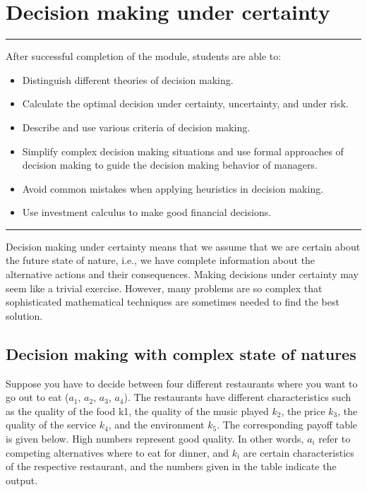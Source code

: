 \documentclass[
  12pt,
  oneside]{book}
\providecommand{\tightlist}{%
  \setlength{\itemsep}{0pt}\setlength{\parskip}{0pt}}
\theoremstyle{definition}
\theoremstyle{definition}
\theoremstyle{definition}
\theoremstyle{definition}
\theoremstyle{remark}
\begin{document}
\section{Decision making under certainty}\label{decision-making-under-certainty}

\begin{center}\rule{0.5\linewidth}{0.5pt}\end{center}

After successful completion of the module, students are able to:

\begin{itemize}
\tightlist
\item
  Distinguish different theories of decision making.
\item
  Calculate the optimal decision under certainty, uncertainty, and under risk.
\item
  Describe and use various criteria of decision making.
\item
  Simplify complex decision making situations and use formal approaches of decision making to guide the decision making behavior of managers.
\item
  Avoid common mistakes when applying heuristics in decision making.
\item
  Use investment calculus to make good financial decisions.
\end{itemize}

\begin{center}\rule{0.5\linewidth}{0.5pt}\end{center}

Decision making under certainty means that we assume that we are certain about the future state of nature, i.e., we have complete information about the alternative actions and their consequences. Making decisions under certainty may seem like a trivial exercise. However, many problems are so complex that sophisticated mathematical techniques are sometimes needed to find the best solution.

\subsection{Decision making with complex state of natures}\label{decision-making-with-complex-state-of-natures}

Suppose you have to decide between four different restaurants where you want to go out to eat (\(a_1\), \(a_2\), \(a_3\), \(a_4\)). The restaurants have different characteristics such as the quality of the food k1, the quality of the music played \(k_2\), the price \(k_3\), the quality of the service \(k_4\), and the environment \(k_5\). The corresponding payoff table is given below. High numbers represent good quality. In other words, \(a_i\) refer to competing alternatives where to eat for dinner, and \(k_i\) are certain characteristics of the respective restaurant, and the numbers given in the table indicate the output.
\end{document}
